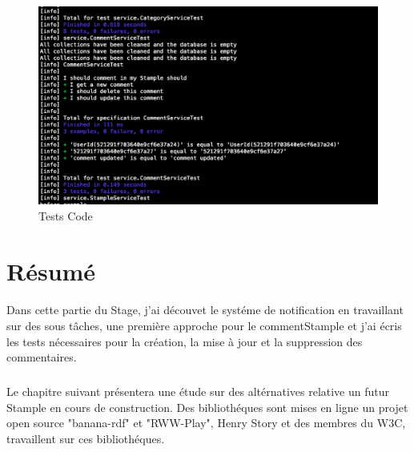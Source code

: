 \begin{figure}[H]
        \centering
                \centering
                \includegraphics[width=\textwidth]{code.png}
               \caption{Tests Code}
		\label{fig:Test Code}
\end{figure}
\section{Résumé}
\paragraph{}
Dans cette partie du Stage, j'ai découvet le systéme de notification en travaillant sur des sous tâches, une première approche pour le commentStample et j'ai écris les tests nécessaires pour la création, la mise à jour et la suppression des commentaires.
\subparagraph{}
Le chapitre suivant présentera une étude sur des altérnatives relative un futur Stample en cours de construction.
Des bibliothéques sont mises en ligne un projet open source "banana-rdf" et "RWW-Play", Henry Story et des membres du W3C, travaillent sur ces bibliothéques.